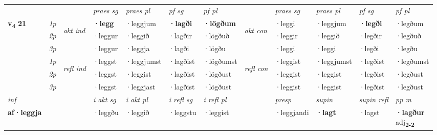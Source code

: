 \begin{longtable}[l]{X>{\footnotesize\itshape}llXXXXlXXXX}
\midrule

 & &   & \textit{praes sg}  & \textit{praes pl}    & \textit{ pf sg} & \textit{pf pl} & & \textit{praes sg}  & \textit{praes pl}    & \textit{pf sg} & \textit{pf pl }  \\ \cmidrule{4-7} \cmidrule{9-12}
 \multirow{2}{*}{{{\textbf{v{\textsubscript{4}}} \Large{\textbf{21}}}}}  & 1p & \multirow{3}{*}{\begin{turn}{90}\textit{akt ind}\end{turn}} & \textbf{·legg} & ·leggjum & \textbf{·lagði} & \textbf{·lögðum} & \multirow{3}{*}{\begin{turn}{90}\textit{akt con}\end{turn}} &·leggi & ·leggjum & \textbf{·legði} & ·legðum\\*
 & 2p &  &  ·leggur  & ·leggið & ·lagðir & ·lögðuð & & ·leggir & ·leggið & ·legðir & ·legðuð \\*
 & 3p &  & ·leggur & ·leggja & ·lagði & ·lögðu & & ·leggi & ·leggi& ·legði & ·legðu \\*
\cmidrule{4-7} \cmidrule{9-12}
 & 1p & \multirow{3}{*}{\begin{turn}{90}\textit{refl ind}\end{turn}}  & ·leggst & ·leggjumst & ·lagðist & ·lögðumst & \multirow{3}{*}{\begin{turn}{90}\textit{refl con}\end{turn}}  &·leggist & ·leggjumst & ·legðist & ·legðumst \\*
 & 2p &  & ·leggst & ·leggist & ·lagðist & ·lögðust & &·leggist & ·leggist & ·legðist & ·legðust \\*
 & 3p  & & ·leggst & ·leggjast & ·lagðist & ·lögðust & & ·leggist & ·leggist& ·legðist & ·legðust \\*
\cmidrule{4-7} \cmidrule{9-12}

   {\textit{inf}} & &  & \textit{i akt sg} & \textit{i akt pl} & \textit{i refl sg} & \textit{i refl pl} && \textit{presp} & \textit{supin} & \textit{supin refl} & \textit{pp m} \\*
  {\textbf{af\allowbreak ·leggja}} & && ·leggðu  & ·leggið & ·leggstu & ·leggist && ·leggjandi &  \textbf{·lagt} & ·lagst & \specialcell{\textbf{·lagður} \\ adj\textbf{\textsubscript{2-2}}} \\*

\midrule


\end{longtable}
